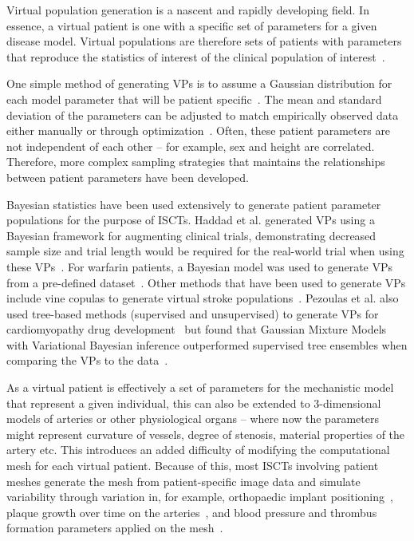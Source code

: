 \documentclass{article}
\begin{document}
Virtual population generation is a nascent and rapidly developing field. In essence, a virtual patient is one with a specific set of parameters for a given disease model. Virtual populations are therefore sets of patients with parameters that reproduce the statistics of interest of the clinical population of interest~\cite{Allen2016}.

One simple method of generating VPs is to assume a Gaussian distribution for each model parameter that will be patient specific~\cite{Gaffney2022, Jenner2021}. The mean and standard deviation of the parameters can be adjusted to match empirically observed data either manually or through optimization~\cite{Alfonso2020}. Often, these patient parameters are not independent of each other – for example, sex and height are correlated. Therefore, more complex sampling strategies that maintains the relationships between patient parameters have been developed.

Bayesian statistics have been used extensively to generate patient parameter populations for the purpose of ISCTs. Haddad et al. generated VPs using a Bayesian framework for augmenting clinical trials, demonstrating decreased sample size and trial length would be required for the real-world trial when using these VPs~\cite{Haddad2017a}. For warfarin patients, a Bayesian model was used to generate VPs from a pre-defined dataset~\cite{Fusaro2013}. Other methods that have been used to generate VPs include vine copulas to generate virtual stroke populations~\cite{Miller2021}. Pezoulas et al. also used tree-based methods (supervised and unsupervised) to generate VPs for cardiomyopathy drug development~\cite{Pezoulas2020} but found that Gaussian Mixture Models with Variational Bayesian inference outperformed supervised tree ensembles when comparing the VPs to the data~\cite{Pezoulas2021}.

As a virtual patient is effectively a set of parameters for the mechanistic model that represent a given individual, this can also be extended to 3-dimensional models of arteries or other physiological organs – where now the parameters might represent curvature of vessels, degree of stenosis, material properties of the artery etc. This introduces an added difficulty of modifying the computational mesh for each virtual patient.
Because of this, most ISCTs involving patient meshes generate the mesh from patient-specific image data and simulate variability through variation in, for example, orthopaedic implant positioning~\cite{AlDirini2019}, plaque growth over time on the arteries~\cite{Pleouras2021}, and blood pressure and thrombus formation parameters applied on the mesh~\cite{SarramiForoushani2021}.
\end{document}
